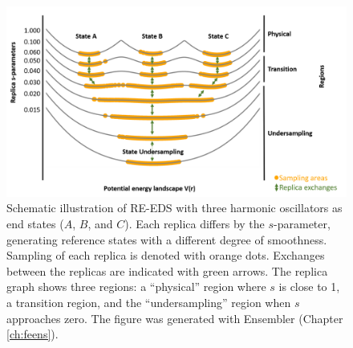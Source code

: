 \begin{figure}[h]
    \centering
    \includegraphics[width=\columnwidth]{fig/theory/Reeds_scheme_first.png}
    \caption{Schematic illustration of RE-EDS with three harmonic oscillators as end states ($A$, $B$, and $C$). Each replica differs by the $s$-parameter, generating reference states with a different degree of smoothness. Sampling of each replica is denoted with orange dots. Exchanges between the replicas are indicated with green arrows. The replica graph shows three regions: a ``physical'' region where $s$ is close to 1, a transition region, and the ``undersampling'' region when $s$ approaches zero. The figure was generated with Ensembler \cite{Ries2021A}  (Chapter \ref{ch:feens}).}
    \label{fig:RE-EDS_Scheme}
\end{figure}

\FloatBarrier

